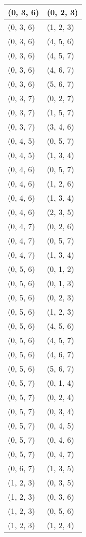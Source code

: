 \begin{footnotesize}
\begin{longtable}[c]{|l|l|}
(0, 3, 6)
&(0, 2, 3)
\\ \hline
(0, 3, 6)
&(1, 2, 3)
\\ \hline
(0, 3, 6)
&(4, 5, 6)
\\ \hline
(0, 3, 6)
&(4, 5, 7)
\\ \hline
(0, 3, 6)
&(4, 6, 7)
\\ \hline
(0, 3, 6)
&(5, 6, 7)
\\ \hline
(0, 3, 7)
&(0, 2, 7)
\\ \hline
(0, 3, 7)
&(1, 5, 7)
\\ \hline
(0, 3, 7)
&(3, 4, 6)
\\ \hline
(0, 4, 5)
&(0, 5, 7)
\\ \hline
(0, 4, 5)
&(1, 3, 4)
\\ \hline
(0, 4, 6)
&(0, 5, 7)
\\ \hline
(0, 4, 6)
&(1, 2, 6)
\\ \hline
(0, 4, 6)
&(1, 3, 4)
\\ \hline
(0, 4, 6)
&(2, 3, 5)
\\ \hline
(0, 4, 7)
&(0, 2, 6)
\\ \hline
(0, 4, 7)
&(0, 5, 7)
\\ \hline
(0, 4, 7)
&(1, 3, 4)
\\ \hline
(0, 5, 6)
&(0, 1, 2)
\\ \hline
(0, 5, 6)
&(0, 1, 3)
\\ \hline
(0, 5, 6)
&(0, 2, 3)
\\ \hline
(0, 5, 6)
&(1, 2, 3)
\\ \hline
(0, 5, 6)
&(4, 5, 6)
\\ \hline
(0, 5, 6)
&(4, 5, 7)
\\ \hline
(0, 5, 6)
&(4, 6, 7)
\\ \hline
(0, 5, 6)
&(5, 6, 7)
\\ \hline
(0, 5, 7)
&(0, 1, 4)
\\ \hline
(0, 5, 7)
&(0, 2, 4)
\\ \hline
(0, 5, 7)
&(0, 3, 4)
\\ \hline
(0, 5, 7)
&(0, 4, 5)
\\ \hline
(0, 5, 7)
&(0, 4, 6)
\\ \hline
(0, 5, 7)
&(0, 4, 7)
\\ \hline
(0, 6, 7)
&(1, 3, 5)
\\ \hline
(1, 2, 3)
&(0, 3, 5)
\\ \hline
(1, 2, 3)
&(0, 3, 6)
\\ \hline
(1, 2, 3)
&(0, 5, 6)
\\ \hline
(1, 2, 3)
&(1, 2, 4)
\\ \hline

\end{longtable}
\end{footnotesize}
